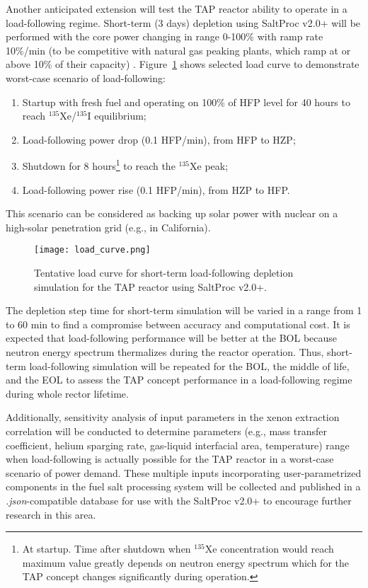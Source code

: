 Another anticipated extension will test the \gls{TAP} reactor ability to 
operate in a load-following regime. Short-term (3 days) depletion using 
SaltProc v2.0+ will be performed with the core power changing in range 0-100\% 
with ramp rate 10\%/min (to be competitive with natural gas peaking plants, 
which ramp at or above 10\% of their capacity) \cite{huff_enabling_2018}. 
Figure~\ref{fig:load} shows selected load curve to demonstrate worst-case 
scenario of load-following:
\begin{enumerate}
	\item Startup with fresh fuel and operating on 100\% of \gls{HFP}
level 
	for 40 hours to reach $^{135}$Xe/$^{135}$I equilibrium;
	\item Load-following power drop (0.1 \gls{HFP}/min), from \gls{HFP} 
	to \gls{HZP};
	\item Shutdown for 8 hours\footnote{At startup. Time after shutdown when 
	$^{135}$Xe concentration would reach maximum value greatly depends on 
	neutron energy spectrum which for the \gls{TAP} concept changes 
	significantly during operation.} to reach the $^{135}$Xe peak;
	\item Load-following power rise (0.1 \gls{HFP}/min), from \gls{HZP} 
	to \gls{HFP}.
\end{enumerate}
This scenario can be considered as backing up solar power with
nuclear on a 
high-solar penetration grid (e.g., in California).
\begin{figure}[bth!] %
	\centering
	\texttt{[image: load\_curve.png]}
	\caption{Tentative load curve for short-term load-following depletion 
	simulation for the \gls{TAP} reactor using SaltProc v2.0+.}
	\label{fig:load}
\end{figure}

The depletion step time for short-term simulation will be varied in a range 
from 1 to 60 min to find a compromise between accuracy and computational cost. 
It is expected that load-following performance will be better at the \gls{BOL} 
because neutron energy spectrum thermalizes during the reactor operation. 
Thus, short-term load-following simulation will be repeated for the \gls{BOL}, 
the middle of life, and the \gls{EOL} to assess the \gls{TAP} concept  
performance in a load-following regime during whole rector lifetime.

Additionally, sensitivity analysis of input parameters in the xenon extraction 
correlation will be conducted to determine parameters (e.g., mass transfer 
coefficient, helium sparging rate, gas-liquid interfacial area, temperature) 
range when load-following is actually possible for the \gls{TAP} 
reactor in a worst-case scenario of power demand. These multiple inputs 
incorporating user-parametrized components in the fuel salt processing 
system will be collected and published in a \textit{.json}-compatible database 
for use with the SaltProc v2.0+ to encourage further research in this area.


